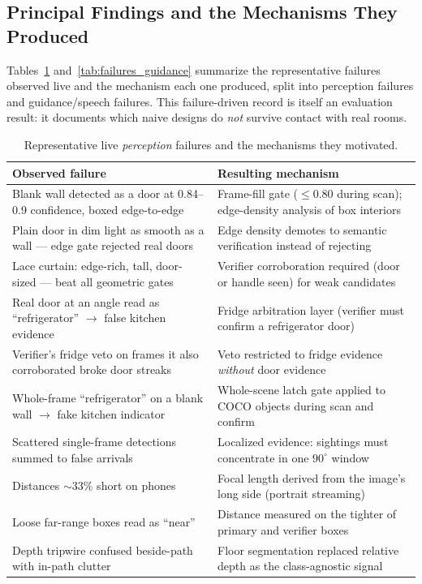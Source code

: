\subsection{Principal Findings and the Mechanisms They Produced}

Tables~\ref{tab:failures_perception} and~\ref{tab:failures_guidance} summarize the
representative failures observed live and the mechanism each one produced, split
into perception failures and guidance/speech failures. This failure-driven record
is itself an evaluation result: it documents which naive designs do \emph{not}
survive contact with real rooms.

\begin{table}[!htbp]
\centering
\caption[Live perception failures]{Representative live \emph{perception} failures
and the mechanisms they motivated.}
\label{tab:failures_perception}
\small
\begin{tabular}{p{5.8cm} p{7.4cm}}
\toprule
\textbf{Observed failure} & \textbf{Resulting mechanism} \\
\midrule
Blank wall detected as a door at 0.84--0.9 confidence, boxed edge-to-edge &
Frame-fill gate ($\leq 0.80$ during scan); edge-density analysis of box interiors \\
Plain door in dim light as smooth as a wall --- edge gate rejected real doors &
Edge density demotes to semantic verification instead of rejecting \\
Lace curtain: edge-rich, tall, door-sized --- beat all geometric gates &
Verifier corroboration required (door or handle seen) for weak candidates \\
Real door at an angle read as ``refrigerator'' $\to$ false kitchen evidence &
Fridge arbitration layer (verifier must confirm a refrigerator door) \\
Verifier's fridge veto on frames it also corroborated broke door streaks &
Veto restricted to fridge evidence \emph{without} door evidence \\
Whole-frame ``refrigerator'' on a blank wall $\to$ fake kitchen indicator &
Whole-scene latch gate applied to COCO objects during scan and confirm \\
Scattered single-frame detections summed to false arrivals &
Localized evidence: sightings must concentrate in one $90^\circ$ window \\
Distances ${\sim}33\%$ short on phones &
Focal length derived from the image's long side (portrait streaming) \\
Loose far-range boxes read as ``near'' &
Distance measured on the tighter of primary and verifier boxes \\
Depth tripwire confused beside-path with in-path clutter &
Floor segmentation replaced relative depth as the class-agnostic signal \\
\bottomrule
\end{tabular}
\end{table}

